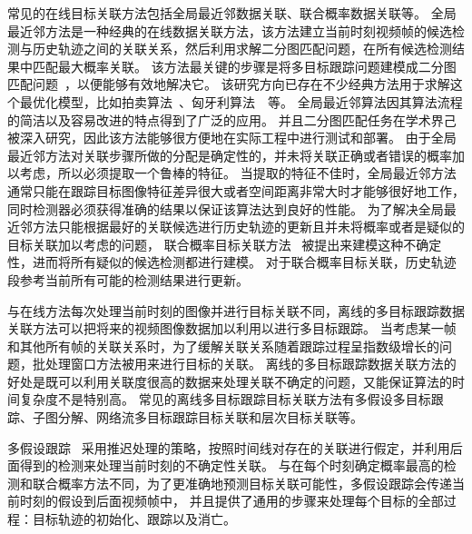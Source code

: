 常见的在线目标关联方法包括全局最近邻数据关联、联合概率数据关联等。
全局最近邻方法是一种经典的在线数据关联方法，该方法建立当前时刻视频帧的候选检测与历史轨迹之间的关联关系，然后利用求解二分图匹配问题，在所有候选检测结果中匹配最大概率关联。
该方法最关键的步骤是将多目标跟踪问题建模成二分图匹配问题~\cite{bertsekas1994linear,veenman2001resolving}，以便能够有效地解决它。
该研究方向已存在不少经典方法用于求解这个最优化模型，比如拍卖算法~\cite{bertsekas1988the}、匈牙利算法~\cite{unkres1957algorithms}~等。
全局最近邻算法因其算法流程的简洁以及容易改进的特点得到了广泛的应用。
并且二分图匹配任务在学术界己被深入研究，因此该方法能够很方便地在实际工程中进行测试和部署。
由于全局最近邻方法对关联步骤所做的分配是确定性的，并未将关联正确或者错误的概率加以考虑，所以必须提取一个鲁棒的特征。
当提取的特征不佳时，全局最近邻方法通常只能在跟踪目标图像特征差异很大或者空间距离非常大时才能够很好地工作，同时检测器必须获得准确的结果以保证该算法达到良好的性能。
为了解决全局最近邻方法只能根据最好的关联候选进行历史轨迹的更新且并未将概率或者是疑似的目标关联加以考虑的问题，
联合概率目标关联方法~\cite{bar-shalom1987tracking} 被提出来建模这种不确定性，进而将所有疑似的候选检测都进行建模。
对于联合概率目标关联，历史轨迹段参考当前所有可能的检测结果进行更新。

与在线方法每次处理当前时刻的图像并进行目标关联不同，离线的多目标跟踪数据关联方法可以把将来的视频图像数据加以利用以进行多目标跟踪。
当考虑某一帧和其他所有帧的关联关系时，为了缓解关联关系随着跟踪过程呈指数级增长的问题，批处理窗口方法被用来进行目标的关联。
离线的多目标跟踪数据关联方法的好处是既可以利用关联度很高的数据来处理关联不确定的问题，又能保证算法的时间复杂度不是特别高。
常见的离线多目标跟踪目标关联方法有多假设多目标跟踪、子图分解、网络流多目标跟踪目标关联和层次目标关联等。

多假设跟踪~\cite{reid1989an,multi_hypo} 采用推迟处理的策略，按照时间线对存在的关联进行假定，并利用后面得到的检测来处理当前时刻的不确定性关联。
与在每个时刻确定概率最高的检测和联合概率方法不同，为了更准确地预测目标关联可能性，多假设跟踪会传递当前时刻的假设到后面视频帧中，
并且提供了通用的步骤来处理每个目标的全部过程：目标轨迹的初始化、跟踪以及消亡。

